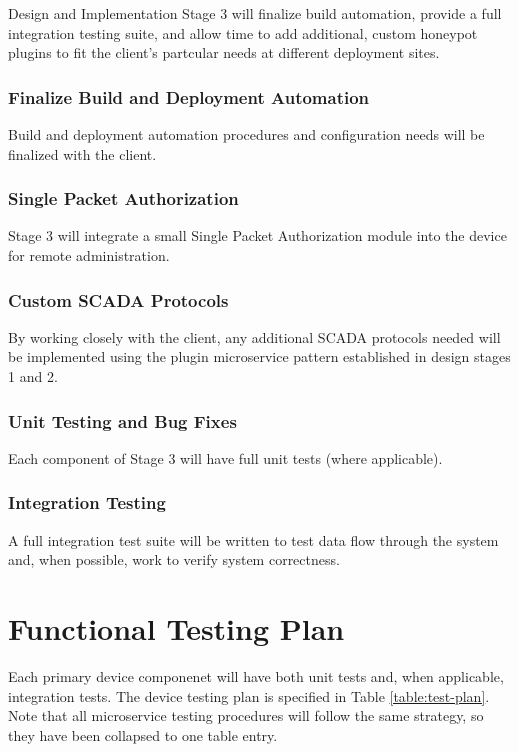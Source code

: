 Design and Implementation Stage 3 will finalize build automation, provide a
full integration testing suite, and allow time to add additional, custom
honeypot plugins to fit the client's partcular needs at different deployment
sites.

\subsubsection{Finalize Build and Deployment Automation}

Build and deployment automation procedures and configuration needs will be
finalized with the client.

\subsubsection{Single Packet Authorization}

Stage 3 will integrate a small Single Packet Authorization module into the
device for remote administration.

\subsubsection{Custom SCADA Protocols}

By working closely with the client, any additional SCADA protocols needed will
be implemented using the plugin microservice pattern established in design
stages 1 and 2.

\subsubsection{Unit Testing and Bug Fixes}

Each component of Stage 3 will have full unit tests (where applicable).

\subsubsection{Integration Testing}

A full integration test suite will be written to test data flow through the
system and, when possible, work to verify system correctness.

\section{Functional Testing Plan}

Each primary device componenet will have both unit tests and, when applicable,
integration tests. The device testing plan is specified
in Table \ref{table:test-plan}. Note that all microservice testing procedures
will follow the same strategy, so they have been collapsed to one table
entry.

